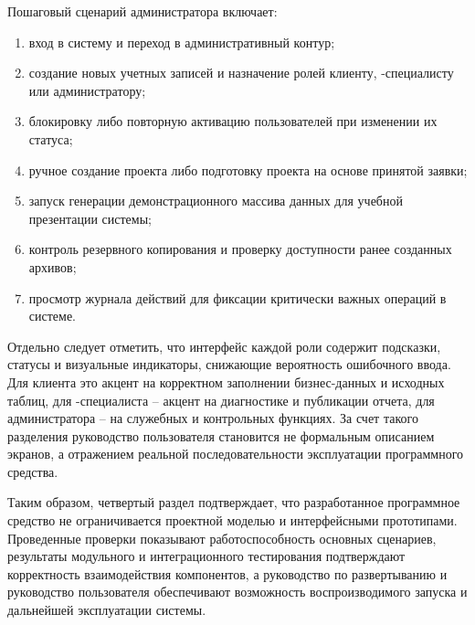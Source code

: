 Пошаговый сценарий администратора включает:
\begin{enumerate}
    \item вход в систему и переход в административный контур;
    \item создание новых учетных записей и назначение ролей клиенту, -специалисту или администратору;
    \item блокировку либо повторную активацию пользователей при изменении их статуса;
    \item ручное создание проекта либо подготовку проекта на основе принятой заявки;
    \item запуск генерации демонстрационного массива данных для учебной презентации системы;
    \item контроль резервного копирования и проверку доступности ранее созданных архивов;
    \item просмотр журнала действий для фиксации критически важных операций в системе.
\end{enumerate}

Отдельно следует отметить, что интерфейс каждой роли содержит подсказки, статусы и визуальные индикаторы, снижающие вероятность ошибочного ввода. Для клиента это акцент на корректном заполнении бизнес-данных и исходных таблиц, для -специалиста -- акцент на диагностике и публикации отчета, для администратора -- на служебных и контрольных функциях. За счет такого разделения руководство пользователя становится не формальным описанием экранов, а отражением реальной последовательности эксплуатации программного средства.

Таким образом, четвертый раздел подтверждает, что разработанное программное средство не ограничивается проектной моделью и интерфейсными прототипами. Проведенные проверки показывают работоспособность основных сценариев, результаты модульного и интеграционного тестирования подтверждают корректность взаимодействия компонентов, а руководство по развертыванию и руководство пользователя обеспечивают возможность воспроизводимого запуска и дальнейшей эксплуатации системы.
